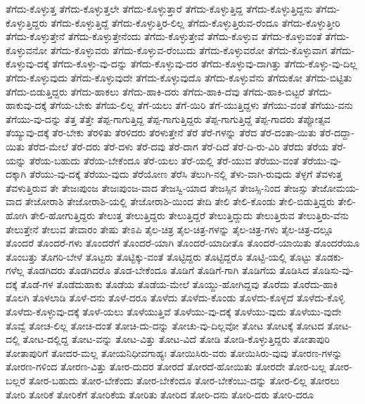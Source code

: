 {ತೆಗೆದು-ಕೊಳ್ಳುತ್ತ
ತೆಗೆದು-ಕೊಳ್ಳುತ್ತಲೇ
ತೆಗೆದು-ಕೊಳ್ಳುತ್ತಾರೆ
ತೆಗೆದು-ಕೊಳ್ಳುತ್ತಿದ್ದ
ತೆಗೆದು-ಕೊಳ್ಳುತ್ತಿದ್ದನು
ತೆಗೆದು-ಕೊಳ್ಳುತ್ತಿದ್ದರು
ತೆಗೆದು-ಕೊಳ್ಳುತ್ತಿದ್ದೆ
ತೆಗೆದು-ಕೊಳ್ಳುತ್ತಿರ-ಲಿಲ್ಲ
ತೆಗೆದು-ಕೊಳ್ಳುತ್ತಿರುವ-ರೆಂದೂ
ತೆಗೆದು-ಕೊಳ್ಳುತ್ತೀರಿ
ತೆಗೆದು-ಕೊಳ್ಳುತ್ತೇನೆ
ತೆಗೆದು-ಕೊಳ್ಳುತ್ತೇನೆಂದು
ತೆಗೆದು-ಕೊಳ್ಳುತ್ತೇವೆ
ತೆಗೆದು-ಕೊಳ್ಳುವ
ತೆಗೆದು-ಕೊಳ್ಳುವಂತೆ
ತೆಗೆದು-ಕೊಳ್ಳುವನೋ
ತೆಗೆದು-ಕೊಳ್ಳುವರು
ತೆಗೆದು-ಕೊಳ್ಳುವ-ರೆಂಬುದು
ತೆಗೆದು-ಕೊಳ್ಳುವರೋ
ತೆಗೆದು-ಕೊಳ್ಳುವಾಗ
ತೆಗೆದು-ಕೊಳ್ಳುವು-ದಕ್ಕೆ
ತೆಗೆದು-ಕೊಳ್ಳು-ವು-ದನ್ನು
ತೆಗೆದು-ಕೊಳ್ಳುವು-ದರ
ತೆಗೆದು-ಕೊಳ್ಳುವು-ದಾಗಿತ್ತು
ತೆಗೆದು-ಕೊಳ್ಳು-ವು-ದಿಲ್ಲ
ತೆಗೆದು-ಕೊಳ್ಳುವುದು
ತೆಗೆದು-ಕೊಳ್ಳುವುದೇ
ತೆಗೆದು-ಕೊಳ್ಳುವುದೊ
ತೆಗೆದು-ಕೊಳ್ಳುವೆನು
ತೆಗೆದುಕೋ
ತೆಗೆದು-ಬಿಟ್ಟಿತು
ತೆಗೆದು-ಬಿಡುತ್ತಿದ್ದರು
ತೆಗೆದು-ಹಾಕಲು
ತೆಗೆದು-ಹಾಕಿ-ದರು
ತೆಗೆದು-ಹಾಕಿ-ದೆವು
ತೆಗೆದು-ಹಾಕಿ-ಬಿಟ್ಟರೆ
ತೆಗೆದು-ಹಾಕುವು-ದಕ್ಕೆ
ತೆಗೆಯ-ಬೇಕು
ತೆಗೆಯ-ಲಿಲ್ಲ
ತೆಗೆ-ಯಲು
ತೆಗೆ-ಯಿರಿ
ತೆಗೆ-ಯುತ್ತಿದ್ದಳು
ತೆಗೆಯು-ವಂತೆ
ತೆಗೆಯು-ವನು
ತೆಗೆಯು-ವು-ದನ್ನು
ತೆತ್ತ
ತೆತ್ತೇ
ತೆಪ್ಪ-ಗಾಗುತ್ತಿದ್ದ
ತೆಪ್ಪ-ಗಾಗುತ್ತಿದ್ದರು
ತೆಪ್ಪ-ಗಾಗುತ್ತಿದ್ದೆ
ತೆಪ್ಪ-ಗಾದರು
ತೆಪ್ಪೋತ್ಸವ
ತೆಯ್ಯುವು-ದಕ್ಕೆ
ತೆರ-ಬೇಕು
ತೆರಳಿತು
ತೆರಳಿದರು
ತೆರಳುತ್ತೇನೆ
ತೆರೆ
ತೆರೆ-ಗಳನ್ನು
ತೆರೆದ
ತೆರೆ-ದಂತಾ-ಯಿತು
ತೆರೆ-ದದ್ದಾ-ಯಿತು
ತೆರೆದ-ಮೇಲೆ
ತೆರೆ-ದರು
ತೆರೆ-ದಳು
ತೆರೆ-ದವು
ತೆರೆ-ದಾಗ
ತೆರೆ-ದಿದೆ
ತೆರೆ-ದಿ-ರು-ವಿರಿ
ತೆರೆದು
ತೆರೆಯ
ತೆರೆ-ಯನ್ನು
ತೆರೆಯ-ಬಹುದು
ತೆರೆಯ-ಬೇಕೆಂದೂ
ತೆರೆ-ಯಲು
ತೆರೆ-ಯಲ್ಲಿ
ತೆರೆ-ಯುವ
ತೆರೆಯು-ವಂತೆ
ತೆರೆಯು-ವು-ದಕ್ಕಾಗಿ
ತೆರೆಯು-ವು-ದಕ್ಕೆ
ತೆರೆಯು-ವುದು
ತೆರೆಯೋಣ
ತೆರೆಸಿ
ತೆಲುಗಿ-ನಲ್ಲಿ
ತೆಳು-ವಾಗಿ-ರುವುದು
ತೆಳ್ಳಗೆ
ತೆವಳುತ್ತ
ತೆವಳುತ್ತಿರುವ
ತೇ
ತೇಜಃಪುಂಜ
ತೇಜಃಪುಂಜ-ವಾದ
ತೇಜಸ್ವಿ-ಯಾದ
ತೇಜಸ್ಸಿನ
ತೇಜಸ್ಸಿ-ನಿಂದ
ತೇಜಸ್ಸು
ತೇಜೋಮಯ-ವಾದ
ತೇಜೋರಾಶಿ
ತೇಜೋರಾಶಿ-ಯಲ್ಲಿ
ತೇಜೋರಾಶಿ-ಯಿಂದ
ತೇದಿ
ತೇಲಿ
ತೇಲಿ-ಕೊಂಡು
ತೇಲಿ-ಬಿಡುತ್ತಿದ್ದರು
ತೇಲಿ-ಹೋಗಿ
ತೇಲಿ-ಹೋಗುತ್ತಿದ್ದರು
ತೇಲುತ್ತ
ತೇಲುತ್ತಿದ್ದರು
ತೇಲುತ್ತಿದ್ದರೆ
ತೇಲುತ್ತಿದ್ದುದು
ತೇಲುತ್ತಿರುವ
ತೇಲುತ್ತಿರು-ವೆನು
ತೇಲುತ್ತೇನೆ
ತೇಲುವ
ತೇವಾರಂ
ತೇಷು
ತೇಽಪಿ
ತೈಲ-ಚಿತ್ರ
ತೈಲ-ಚಿತ್ರ-ಗಳನ್ನು
ತೈಲ-ಚಿತ್ರ-ಗಳು
ತೈಲ-ಚಿತ್ರ-ದಲ್ಲೂ
ತೊಂದರೆ
ತೊಂದರೆ-ಗಳು
ತೊಂದರೆಗೆ
ತೊಂದರೆ-ಯಾಗಿ
ತೊಂದರೆ-ಯಾದೀತೊ
ತೊಂದರೆ-ಯಾಯಿತು
ತೊಂದರೆಯೂ
ತೊಂಬತ್ತು
ತೊಗರಿ-ಬೇಳೆ
ತೊಟ್ಟರು
ತೊಟ್ಟಿಕ್ಕು-ವಂತೆ
ತೊಟ್ಟಿದ್ದರು
ತೊಟ್ಟಿದ್ದರೊ
ತೊಟ್ಟಿ-ಯಲ್ಲಿ
ತೊಟ್ಟು
ತೊಡಕು-ಗಳೆಲ್ಲ
ತೊಡಗಿದರು
ತೊಡಗಿದರೊ
ತೊಡ-ಬೇಕೆಂದೂ
ತೊಡಿಗೆ
ತೊಡಿಗೆ-ಗಾಗಿ
ತೊಡಿಗೆಯ
ತೊಡಿಸಿದ
ತೊಡಿಸು-ವು-ದಕ್ಕೆ
ತೊಡೆ-ಗಳ
ತೊಡೆದುಹಾಕು
ತೊಡೆಯ
ತೊಡೆಯ-ಮೇಲೆ
ತೊಯ್ದು-ಹೋಗಿದ್ದವು
ತೊರೆದು
ತೊರೆದು-ಹಾಕಿ
ತೊಲಗಿ
ತೊಳಲಾಡಿ
ತೊಳೆ-ದನು
ತೊಳೆ-ದರೂ
ತೊಳೆದು
ತೊಳೆದು-ಕೊಂಡು
ತೊಳೆದು-ಕೊಳ್ಳದೆ
ತೊಳೆದು-ಕೊಳ್ಳಿ
ತೊಳೆದು-ಕೊಳ್ಳುವು-ದಕ್ಕೆ
ತೊಳೆ-ಯಲು
ತೊಳೆಯುತ್ತಿವೆ
ತೊಳೆಯು-ವು-ದಕ್ಕೆ
ತೊಳೆಯು-ವುದು
ತೊಳೆಯು-ವುದೇ
ತೊವ್ವೆ
ತೋಚ-ಲಿಲ್ಲ
ತೋಚಿ-ದಂತೆ
ತೋಚಿ-ದು-ದನ್ನು
ತೋಚು-ವು-ದಿಲ್ಲವೋ
ತೋಟ
ತೋಟಕ್ಕೆ
ತೋಟದ
ತೋಟ-ದಲ್ಲಿ
ತೋಟ-ದಲ್ಲಿದ್ದ
ತೋಟ-ವನ್ನು
ತೋಟ-ವಿತ್ತು
ತೋಟ-ವಿದೆ
ತೋಡಿ
ತೋಡಿ-ಕೊಳ್ಳುತ್ತಿದ್ದರು
ತೋತಾಪುರಿ
ತೋತಾಪುರಿಗೆ
ತೋದರ-ಮಲ್ಲ
ತೋಯನಿಧೀವಗಾಹ್ಯಃ
ತೋಯಿಸಿರು-ವರು
ತೋಯಿಸಿರು-ವುವು
ತೋರಣ-ಗಳನ್ನು
ತೋರಣ-ಗಳಿಂದ
ತೋರಣ-ವಿತ್ತು
ತೋರ-ದುದರ
ತೋರದೆ
ತೋರದೆ-ಹೋಯಿತು
ತೋರದೇ
ತೋರ-ಬಲ್ಲ
ತೋರ-ಬಲ್ಲರೆ
ತೋರ-ಬಹುದು
ತೋರ-ಬೇಕೆಂದು
ತೋರ-ಬೇಕೆಂದೂ
ತೋರ-ಬೇಕೆಂಬು-ದನ್ನು
ತೋರ-ಲಿಲ್ಲ
ತೋರಲು
ತೋರಿ
ತೋರಿಕೆ
ತೋರಿಕೆಗೆ
ತೋರಿಕೆಯ
ತೋರಿತು
ತೋರಿದ
ತೋರಿ-ದನು
ತೋರಿ-ದರು
ತೋರಿ-ದರೂ
}
